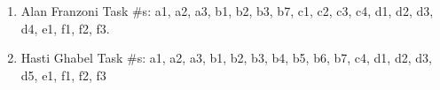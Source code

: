 \documentclass{sigchi}
\begin{document}
\begin{enumerate}
	\item Alan Franzoni Task \#s: a1, a2, a3, b1, b2, b3, b7, c1, c2, c3, c4, d1, d2, d3, d4, e1, f1, f2, f3.
	\item Hasti Ghabel Task \#s: a1,  a2, a3, b1, b2, b3, b4, b5, b6, b7, c4, d1, d2, d3, d5, e1, f1, f2, f3
\end{enumerate}



\balance{}

\balance{}



\end{document}

